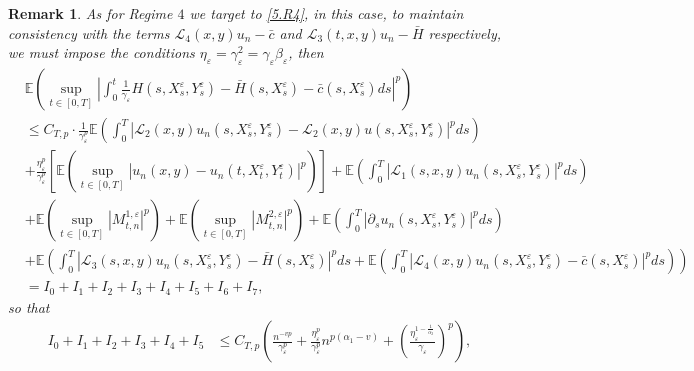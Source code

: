 \documentclass[11pt,reqno]{amsart}
\newtheorem{remark}{\indent Remark}[section]
\numberwithin{equation}{section}
\begin{document}
\begin{remark}
As for Regime $4$ we target to \eqref{5.R4}, in this case,  to maintain consistency with the terms $ \mathcal{L}_{4}(x,y)u_{n}-\bar{c}$ and $\mathcal{L}_{3}(t,x,y)u_{n}-\bar{H}$ respectively,  we must impose the conditions  $\eta_{\varepsilon}=\gamma_{\varepsilon}^{2}=\gamma_{\varepsilon}\beta_{\varepsilon}$, then
\begin{align}
	&\mathbb{E}\left( \sup_{t\in [0,T]}\left| \int_{0}^{t} \frac{1}{\gamma_{\varepsilon}}H(s,X_{s}^{\varepsilon},Y_{s}^{\varepsilon})- \bar{H}(s,X_{s}^{\varepsilon})- \bar{c}(s,X_{s}^{\varepsilon})ds\right|^{p} \right)\nonumber \\
	&\leq C_{T,p}\cdot\frac{1}{\gamma_{\varepsilon}^{p}} \mathbb{E}\left( \int_{0}^{T}| \mathcal{L}_{2}(x,y)u_{n}(s,X_{s}^{\varepsilon},Y_{s}^{\varepsilon})-\mathcal{L}_{2}(x,y)u(s,X_{s}^{\varepsilon},Y_{s}^{\varepsilon})|^{p} ds\right) \nonumber \\
	&+  \frac{\eta_{\varepsilon}^{p}}{\gamma_{\varepsilon}^{p}}\left[ \mathbb{E}\left( \sup_{t\in [0,T]}|u_{n}(x,y)-u_{n}(t,X_{t}^{\varepsilon},Y_{t}^{\varepsilon})|^{p}\right)\right] +\mathbb{E}\left( \int_{0}^{T}|\mathcal{L}_{1}(s,x,y)u_{n}(s,X_{s}^{\varepsilon},Y_{s}^{\varepsilon})|^{p}ds\right)\nonumber	\\
	&
	+\mathbb{E}\left( \sup_{t\in [0,T]}|M_{t,n}^{1,\varepsilon}|^{p}\right)+\mathbb{E}\left( \sup_{t\in [0,T]}|M_{t,n}^{2,\varepsilon}|^{p}\right) + \mathbb{E}\left( \int_{0}^{T}|\partial_{s}u_{n}(s,X_{s}^{\varepsilon},Y_{s}^{\varepsilon})| ^{p}ds
	\right) \nonumber\\
	&		+\mathbb{E}\left( \int_{0}^{T}|\mathcal{L}_{3}(s,x,y)u_{n}(s,X_{s}^{\varepsilon},Y_{s}^{\varepsilon})- \bar{H}(s,X_{s}^{\varepsilon})|^{p}ds	+\mathbb{E}\left( \int_{0}^{T}|\mathcal{L}_{4}(x,y)u_{n}(s,X_{s}^{\varepsilon},Y_{s}^{\varepsilon})- \bar{c}(s,X_{s}^{\varepsilon})|^{p}ds\right)\right)\nonumber\\
	&=I_{0}+ I_{1}+I_{2}+I_{3}+I_{4}+I_{5}+I_{6}+I_{7},\label{5.77}
\end{align}
so that 
\begin{equation}\label{5.78}
	\begin{aligned}
		I_{0}+I_{1}+I_{2}+I_{3}+I_{4}+I_{5}&\leq C_{T,p}\left( \frac{n^{-vp}}{\gamma_{\varepsilon}^{p}}+\frac{\eta_{\varepsilon}^{p}}{\gamma_{\varepsilon}^{p}}n^{p(\alpha_{1}-v)}+ \left( \frac{\eta_{\varepsilon}^{1-\frac{1}{\alpha_{2}}}}{\gamma_{\varepsilon} } \right) ^{p}\right),\\
	\end{aligned}
\end{equation}

\end{remark}
\end{document}
